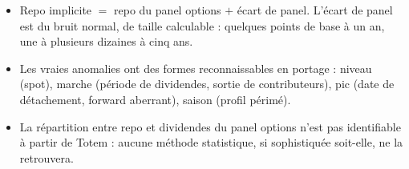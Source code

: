 \begin{retenir}
\begin{itemize}[leftmargin=12pt]
\item Repo implicite $=$ repo du panel options $+$ écart de panel. L'écart de panel est du bruit normal, de taille
calculable : quelques points de base à un an, une à plusieurs dizaines à cinq ans.
\item Les vraies anomalies ont des formes reconnaissables en portage : niveau (spot), marche (période de dividendes,
sortie de contributeurs), pic (date de détachement, forward aberrant), saison (profil périmé).
\item La répartition entre repo et dividendes du panel options n'est pas identifiable à partir de Totem : aucune
méthode statistique, si sophistiquée soit-elle, ne la retrouvera.
\end{itemize}
\end{retenir}
